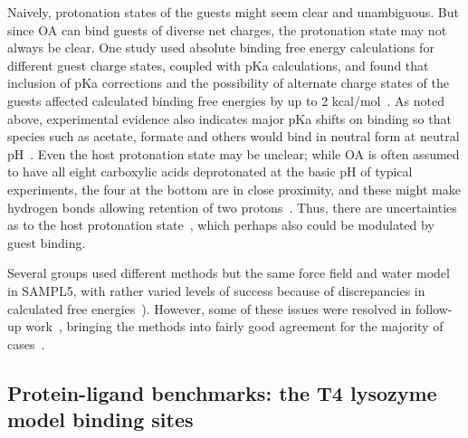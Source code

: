 \documentclass[aps,pre,twocolumn,nofootinbib,superscriptaddress,10pt, final,tightenlines]{revtex4-1}
\begin{document}
Naively, protonation states of the guests might seem clear and unambiguous.
But since OA can bind guests of diverse net charges, the protonation state may not always be clear.  
One study used absolute binding free energy calculations for different guest charge states, coupled with pKa calculations, and found that inclusion of pKa corrections and the possibility of alternate charge states of the guests affected calculated binding free energies by up to 2 kcal/mol~\cite{tofoleanu_absolute_2016}. As noted above, experimental evidence also indicates major pKa shifts on binding so that species such as acetate, formate and others would bind in neutral form at neutral pH~\cite{wang_itc_2016, sokkalingam_binding_2016}. 
Even the host protonation state may be unclear; while OA is often assumed to have all eight carboxylic acids deprotonated at the basic pH of typical experiments, the four at the bottom are in close proximity, and these might make hydrogen bonds allowing retention of two protons~\cite{ewell_water_2008}.  
Thus, there are uncertainties as to the host protonation state~\cite{muddana_sampl4_2014, ewell_water_2008}, which perhaps also could be modulated by guest binding.  


Several groups used different methods but the same force field and water model in SAMPL5, with rather varied levels of success because of discrepancies in calculated free energies~\cite{yin_sampl5_preprint, bosisio_blinded_2016, bhakat_resolving_2016}). 
However, some of these issues were resolved in follow-up work~\cite{bhakat_resolving_2016}, bringing the methods into fairly good agreement for the majority of cases~\cite{yin_sampl5_2016, bosisio_blinded_2016}.

\subsection{Protein-ligand benchmarks: the T4 lysozyme model binding sites}
\end{document}
